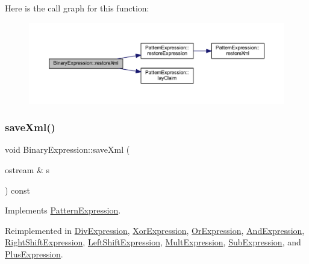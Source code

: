 Here is the call graph for this function\+:
\nopagebreak
\begin{figure}[H]
\begin{center}
\leavevmode
\includegraphics[width=350pt]{class_binary_expression_a05e25a311c4f20e01317a707668cf71c_cgraph}
\end{center}
\end{figure}
\mbox{\label{class_binary_expression_a4b9e768a619b713d6c1ff35a618d98ec}} 
\subsubsection{\texorpdfstring{saveXml()}{saveXml()}}
{\footnotesize\ttfamily void Binary\+Expression\+::save\+Xml (\begin{DoxyParamCaption}\item[{ostream \&}]{s }\end{DoxyParamCaption}) const\hspace{0.3cm}{\ttfamily [virtual]}}



Implements \mbox{\hyperlink{class_pattern_expression_a0d9c89ffbf4a22fac68189a845cde92a}{Pattern\+Expression}}.



Reimplemented in \mbox{\hyperlink{class_div_expression_ac366efa9af2e0a858b06e1a8e3479aa9}{Div\+Expression}}, \mbox{\hyperlink{class_xor_expression_a275b64efdd4752af7b69923475286f43}{Xor\+Expression}}, \mbox{\hyperlink{class_or_expression_aab8268d75147e85ea9110a07e0add377}{Or\+Expression}}, \mbox{\hyperlink{class_and_expression_a5e1acc349ab902895d71b6650193e3e3}{And\+Expression}}, \mbox{\hyperlink{class_right_shift_expression_ac5b992fab5ad4df326b2ae9647496828}{Right\+Shift\+Expression}}, \mbox{\hyperlink{class_left_shift_expression_a2ddfd821596bb45f2c1b5fcd4ca2f764}{Left\+Shift\+Expression}}, \mbox{\hyperlink{class_mult_expression_a98a416d51ae41bf94a6e211e310e6d53}{Mult\+Expression}}, \mbox{\hyperlink{class_sub_expression_ad928f4c50f72f0c16872aad6071a4387}{Sub\+Expression}}, and \mbox{\hyperlink{class_plus_expression_ab5da68f4bb5bed8e1eb0244f86bf8c23}{Plus\+Expression}}.



